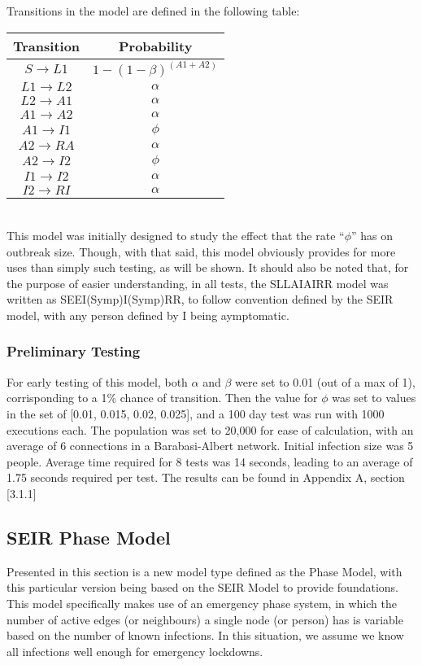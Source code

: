 \documentclass{article}
\numberwithin{equation}{section} %
\begin{document}
\begin{multicols}{2}
  Transitions in the model are defined in the following table: \\
  \begin{tabular}{|c|c|}
    \hline
    Transition & Probability \\
    \hline
    $S \rightarrow L1$ & $1 - (1 - \beta) ^ {(A1+A2)}$ \\
    $L1 \rightarrow L2$ & $\alpha$ \\
    $L2 \rightarrow A1$ & $\alpha$\\
    $A1 \rightarrow A2$ & $\alpha$\\
    $A1 \rightarrow I1$ & $\phi$\\
    $A2 \rightarrow RA$ & $\alpha$\\
    $A2 \rightarrow I2$ & $\phi$\\
    $I1 \rightarrow I2$ & $\alpha$\\
    $I2 \rightarrow RI$ & $\alpha$\\
    \hline
  \end{tabular}\\ 

  This model was initially designed to study the effect that the rate ``$\phi$'' has on outbreak size. Though, with that said, this model obviously provides for more uses than simply such testing, as will be shown. It should also be noted that, for the purpose of easier understanding, in all tests, the SLLAIAIRR model was written as SEEI(Symp)I(Symp)RR, to follow convention defined by the SEIR model, with any person defined by I being aymptomatic.

  \subsubsection{Preliminary Testing}
  For early testing of this model, both $\alpha$ and $\beta$ were set to 0.01 (out of a max of 1), corrisponding to a 1\% chance of transition. Then the value for $\phi$ was set to values in the set of [0.01, 0.015, 0.02, 0.025], and a 100 day test was run with 1000 executions each. The population was set to 20,000 for ease of calculation, with an average of 6 connections in a Barabasi-Albert network. Initial infection size was 5 people. Average time required for 8 tests was 14 seconds, leading to an average of 1.75 seconds required per test. The results can be found in Appendix A, section [3.1.1]

  \subsection{SEIR Phase Model}
  Presented in this section is a new model type defined as the Phase Model, with this particular version being based on the SEIR Model to provide foundations. This model specifically makes use of an emergency phase system, in which the number of active edges (or neighbours) a single node (or person) has is variable based on the number of known infections. In this situation, we assume we know all infections well enough for emergency lockdowns.\\


\end{multicols}
\end{document}
